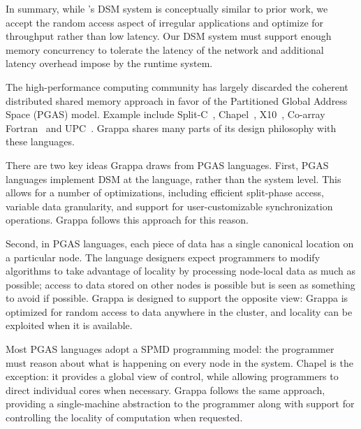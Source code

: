 In summary, while \Grappa's DSM system is conceptually similar to prior work,
we accept the random access aspect of irregular applications and optimize for
throughput rather than low latency. Our DSM system must support enough memory
concurrency to tolerate the latency of the network and additional latency
overhead impose by the runtime system.

\vspace{0.5ex}
The high-performance computing community has largely discarded the
coherent distributed shared memory approach in favor of the
Partitioned Global Address Space (PGAS)
model. Example include Split-C~\cite{Krishnamurthy:1993:PPS:169627.169724},
Chapel~\cite{Chamberlain:2007}, X10~\cite{X10:2005},
Co-array Fortran~\cite{Numrich:1998:CFP:289918.289920} and
UPC~\cite{upc:2005}. Grappa shares many parts of its design philosophy
with these languages.

There are two key ideas Grappa draws from PGAS languages. First, PGAS
languages implement DSM at the language, rather than the system
level. This allows for a number of optimizations, including efficient
split-phase access, variable data granularity, and support for
user-customizable synchronization operations. Grappa follows this
approach for this reason.

Second, in PGAS languages, each piece of data has a single canonical
location on a particular node. The language designers expect
programmers to modify algorithms to take advantage of locality by
processing node-local data as much as possible; access to data stored
on other nodes is possible but is seen as something to avoid if
possible. Grappa is designed to support the opposite view: Grappa is
optimized for random access to data anywhere in the cluster, and
locality can be exploited when it is available.

Most PGAS languages adopt a SPMD programming model: the programmer
must reason about what is happening on every node in the
system. Chapel is the exception: it provides a global view of control,
while allowing programmers to direct individual cores when
necessary. Grappa follows the same approach, providing a
single-machine abstraction to the programmer along with support for
controlling the locality of computation when requested.



